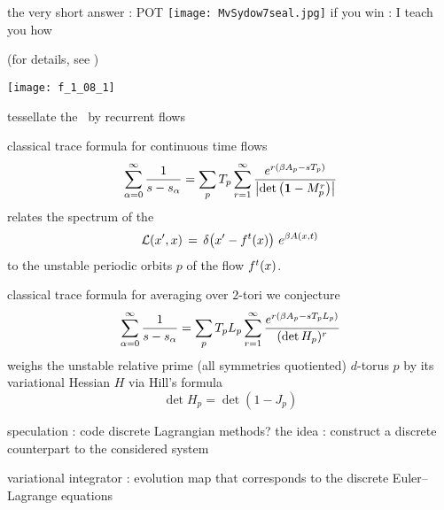 \begin{frame}{the very short answer : POT}
\texttt{[image: MvSydow7seal.jpg]}
\bigskip
if you win : I teach you how

\vfill\hfill (for details, see \wwwcb{})
\end{frame}

\begin{frame}{}
\begin{center}
\texttt{[image: f\_1\_08\_1]}
\end{center}
 tessellate the \statesp\ by {\Large recurrent flows}
\end{frame}

\begin{frame}{classical trace formula for continuous time flows}
\[ %
    \sum_{\alpha=0}^\infty {1 \over \eigenvL -\eigenvL_\alpha }
    =
    \sum_p \period{p} \sum_{r=1}^\infty
    { e^{r (\beta \Obser_p -\eigenvL\period{p})}
            \over  \oneMinJ{r} }
\] %
relates the spectrum of the {\evOper}
\[ %
    \Lop(\ssp',\ssp)\,=\,
    \prpgtr{\ssp' - \flow{t}{\ssp}}
    \, e^{\beta \Obser(\ssp,t)}
    \label{rpo(8)}
\] %
to the unstable periodic orbits $p$ of the flow ${f^{t}(x)}$.

\end{frame}

\begin{frame}{classical trace formula for averaging over $2$-tori}
we conjecture
\[ %
    \sum_{\alpha=0}^\infty {1 \over \eigenvL -\eigenvL_\alpha }
    =
    \sum_p \period{p}\speriod{p} \sum_{r=1}^\infty
    { e^{r (\beta \Obser_p -\eigenvL\period{p}\speriod{p})}
            \over  (\det H_p)^{r} }
\] %
weighs the unstable relative prime (all symmetries quotiented) $d$-torus $p$ by
its variational Hessian $H$ via Hill's formula
\[ %
    \det H_p = \det (1-J_p)
\] %

\end{frame}

\begin{frame}{speculation : code discrete {Lagrangian} methods?}
the idea : construct a discrete counterpart to the considered system

\bigskip

variational integrator :
evolution map that corresponds to the discrete Euler–Lagrange equations

\end{frame}

